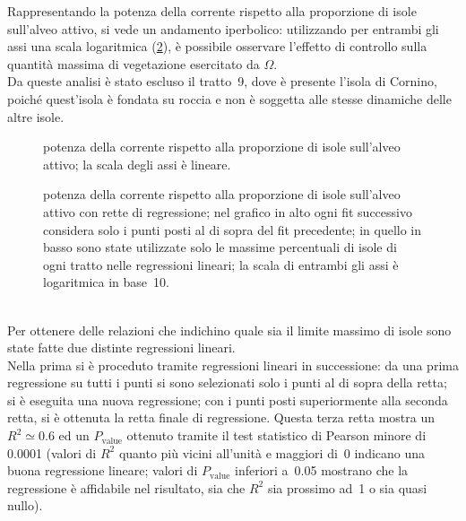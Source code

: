 Rappresentando la potenza della corrente rispetto alla proporzione di isole sull'alveo attivo, si vede un andamento iperbolico: utilizzando per entrambi gli assi una scala logaritmica (\cref{graph:omega-area-percentuale}), è possibile osservare l'effetto di controllo sulla quantità massima di vegetazione esercitato da $\Omega$.
\\
Da queste analisi è stato escluso il tratto~9, dove è presente l'isola di Cornino, poiché quest'isola è fondata su roccia e non è soggetta alle stesse dinamiche delle altre isole.
%
\begin{figure}
	\centering
	
	\caption[potenza della corrente rispetto alla proporzione di isole sull'alveo attivo, grafico lineare]{potenza della corrente rispetto alla proporzione di isole sull'alveo attivo; la scala degli assi è lineare.}
	\label{graph:omega-area-percentuale-linear}
\end{figure}
%
\begin{figure}
	\centering
	
	\caption[potenza della corrente rispetto alla proporzione di isole sull'alveo attivo, grafici bilogaritmico]{potenza della corrente rispetto alla proporzione di isole sull'alveo attivo con rette di regressione; nel grafico in alto ogni fit successivo considera solo i punti posti al di sopra del fit precedente; in quello in basso sono state utilizzate solo le massime percentuali di isole di ogni tratto nelle regressioni lineari; la scala di entrambi gli assi è logaritmica in base~\num{10}.}
	\label{graph:omega-area-percentuale}
\end{figure}
%
%	
%
\\
Per ottenere delle relazioni che indichino quale sia il limite massimo di isole sono state fatte due distinte regressioni lineari.
\\
Nella prima si è proceduto tramite regressioni lineari in successione: da una prima regressione su tutti i punti si sono selezionati solo i punti al di sopra della retta; si è eseguita una nuova regressione; con i punti posti superiormente alla seconda retta, si è ottenuta la retta finale di regressione.
Questa terza retta mostra un $R^2 \simeq 0.6$ ed un $P_\mathrm{value}$ ottenuto tramite il test statistico di Pearson minore di \num{0.0001} (valori di $R^2$ quanto più vicini all'unità e maggiori di~\num{0} indicano una buona regressione lineare; valori di $P_\mathrm{value}$ inferiori a~\num{0.05} mostrano che la regressione è affidabile nel risultato, sia che $R^2$ sia prossimo ad~\num{1} o sia quasi nullo).
